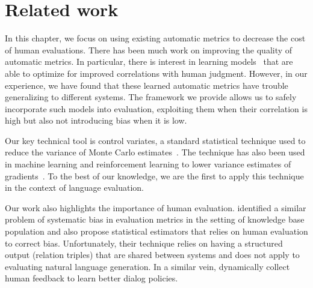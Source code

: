 \section{\label{sec:price:setup} Related work}

In this chapter, we focus on using existing automatic metrics to decrease the cost of human evaluations.
There has been much work on improving the quality of automatic metrics.
In particular, there is interest in learning models~\citep{lowe2017towards,dusek2017referenceless} that are able to optimize for improved correlations with human judgment.
However, in our experience, we have found that these learned automatic metrics have trouble generalizing to different systems.
The framework we provide allows us to safely incorporate such models into evaluation, exploiting them when their correlation is high but also not introducing bias when it is low.

Our key technical tool is control variates, a standard statistical technique used to reduce the variance of Monte Carlo estimates~\citep{ripley2009stochastic}.
The technique has also been used in machine learning and reinforcement learning to lower variance estimates of gradients~\citep{greensmith2004variance, paisley2012variational, ranganath2014black}.
To the best of our knowledge, we are the first to apply this technique in the context of language evaluation.

Our work also highlights the importance of human evaluation.
\citet{chaganty2017unbiased} identified a similar problem of systematic bias in evaluation metrics in the setting of knowledge base population and also propose statistical estimators that relies on human evaluation to correct bias.
Unfortunately, their technique relies on having a structured output (relation triples) that are shared between systems and does not apply to evaluating natural language generation.
In a similar vein, \citet{chang2017affordable} dynamically collect human feedback to learn better dialog policies.
%



